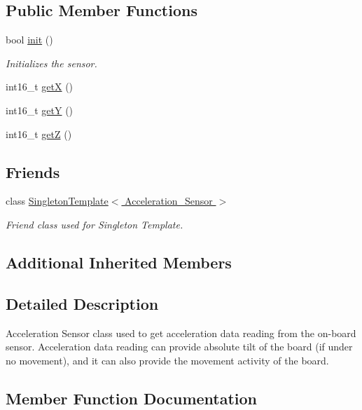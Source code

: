 \subsection*{Public Member Functions}
\begin{DoxyCompactItemize}
\item 
bool \hyperlink{classAcceleration__Sensor_af3c7c3da10972a67263c92d79ca5ecf6}{init} ()
\begin{DoxyCompactList}\small\item\em Initializes the sensor. \end{DoxyCompactList}\item 
int16\+\_\+t \hyperlink{classAcceleration__Sensor_a5012e9e41913187945ebb9a7acf3b758}{getX} ()
\item 
int16\+\_\+t \hyperlink{classAcceleration__Sensor_ab77b00366f9cff5b09927c0b4d30c226}{getY} ()
\item 
int16\+\_\+t \hyperlink{classAcceleration__Sensor_aa2a0912e9ae2280d709b3e7874da437a}{getZ} ()
\end{DoxyCompactItemize}
\subsection*{Friends}
\begin{DoxyCompactItemize}
\item 
class \hyperlink{classAcceleration__Sensor_ad04626d03828abd05f83572d1db4c294}{Singleton\+Template$<$ Acceleration\+\_\+\+Sensor $>$}
\begin{DoxyCompactList}\small\item\em Friend class used for Singleton Template. \end{DoxyCompactList}\end{DoxyCompactItemize}
\subsection*{Additional Inherited Members}


\subsection{Detailed Description}
Acceleration Sensor class used to get acceleration data reading from the on-\/board sensor. Acceleration data reading can provide absolute tilt of the board (if under no movement), and it can also provide the movement activity of the board. 

\subsection{Member Function Documentation}
